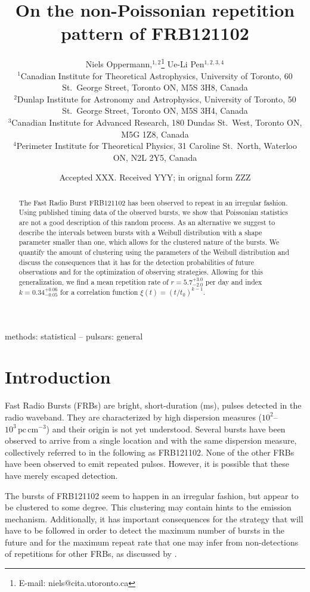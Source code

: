 \documentclass[fleqn,usenatbib]{mnras}
\title{On the non-Poissonian repetition pattern of FRB121102}
\author[N. Oppermann et al.]{Niels Oppermann,$^{1,2}$\thanks{E-mail: niels@cita.utoronto.ca}
Ue-Li Pen$^{1,2,3,4}$
\\
$^{1}$Canadian Institute for Theoretical Astrophysics, University of Toronto, 60 St.\ George Street, Toronto ON, M5S 3H8, Canada\\
$^{2}$Dunlap Institute for Astronomy and Astrophysics, University of Toronto, 50 St.\ George Street, Toronto ON, M5S 3H4, Canada\\
$^{3}$Canadian Institute for Advanced Research, 180 Dundas St.\ West, Toronto ON, M5G 1Z8, Canada\\
$^{4}$Perimeter Institute for Theoretical Physics, 31 Caroline St.\ North, Waterloo ON, N2L 2Y5, Canada
}
\date{Accepted XXX. Received YYY; in orignal form ZZZ}
\newcommand{\new}[1]{#1}
\begin{document}
\label{firstpage}
\pagerange{\pageref{firstpage}--\pageref{lastpage}}
\maketitle

\begin{abstract}
	The Fast Radio Burst FRB121102 has been observed to repeat in an irregular fashion. Using published timing data of the observed bursts, we show that Poissonian statistics are not a good description of this random process. As an alternative we suggest to describe the intervals between bursts with a Weibull distribution with a shape parameter smaller than one, which allows for the clustered nature of the bursts. We quantify the amount of clustering using the parameters of the Weibull distribution and discuss the consequences that it has for the detection probabilities of future observations and for the optimization of observing strategies. \new{Allowing for this generalization, we find a mean repetition rate of $r=5.7^{+3.0}_{-2.0}$ per day and index $k=0.34^{+0.06}_{-0.05}$ for a correlation function $\xi(t)=(t/t_0)^{k-1}$}.
\end{abstract}

\begin{keywords}
methods: statistical -- pulsars: general
\end{keywords}


\section{Introduction}
\label{sec:introduction}

Fast Radio Bursts (FRBs) are bright, short-duration (ms), pulses detected in the radio waveband. They are characterized by high dispersion measures ($10^2$--$10^3\,\mathrm{pc}\,\mathrm{cm}^{-3}$) and their origin is not yet understood. Several bursts have been observed to arrive from a single location and with the same dispersion measure, collectively referred to in the following as FRB121102. None of the other FRBs have been observed to emit repeated pulses. However, it is possible that these have merely escaped detection.

The bursts of FRB121102 seem to happen in an irregular fashion, but appear to be clustered to some degree. This clustering may contain hints to the emission mechanism. Additionally, it has important consequences for the strategy that will have to be followed in order to detect the maximum number of bursts in the future and for the maximum repeat rate that one may infer from non-detections of repetitions for other FRBs, as discussed by \citet{connor-2016}.
\end{document}
